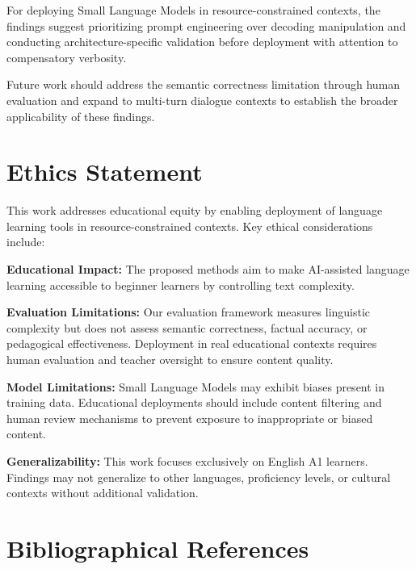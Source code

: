 \documentclass[10pt, a4paper]{article}
\begin{document}
For deploying Small Language Models in resource-constrained contexts, the findings suggest prioritizing prompt engineering over decoding manipulation and conducting architecture-specific validation before deployment with attention to compensatory verbosity.

Future work should address the semantic correctness limitation through human evaluation and expand to multi-turn dialogue contexts to establish the broader applicability of these findings.

\section{Ethics Statement}

This work addresses educational equity by enabling deployment of language learning tools in resource-constrained contexts. Key ethical considerations include:

\textbf{Educational Impact:} The proposed methods aim to make AI-assisted language learning accessible to beginner learners by controlling text complexity.

\textbf{Evaluation Limitations:} Our evaluation framework measures linguistic complexity but does not assess semantic correctness, factual accuracy, or pedagogical effectiveness. Deployment in real educational contexts requires human evaluation and teacher oversight to ensure content quality.

\textbf{Model Limitations:} Small Language Models may exhibit biases present in training data. Educational deployments should include content filtering and human review mechanisms to prevent exposure to inappropriate or biased content.

\textbf{Generalizability:} This work focuses exclusively on English A1 learners. Findings may not generalize to other languages, proficiency levels, or cultural contexts without additional validation.

\section{Bibliographical References}


\end{document}
